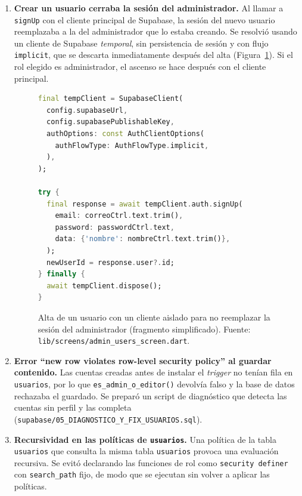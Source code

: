 \begin{enumerate}
  \item \textbf{Crear un usuario cerraba la sesión del administrador.}
  Al llamar a \texttt{signUp} con el cliente principal de Supabase, la
  sesión del nuevo usuario reemplazaba a la del administrador que lo
  estaba creando. Se resolvió usando un cliente de Supabase
  \emph{temporal}, sin persistencia de sesión y con flujo
  \texttt{implicit}, que se descarta inmediatamente después del alta
  (Figura~\ref{fig:impl-tempclient}). Si el rol elegido es
  administrador, el ascenso se hace después con el cliente principal.

\begin{figure}[H]
\begin{lstlisting}[style=codigo,language=Dart]
final tempClient = SupabaseClient(
  config.supabaseUrl,
  config.supabasePublishableKey,
  authOptions: const AuthClientOptions(
    authFlowType: AuthFlowType.implicit,
  ),
);

try {
  final response = await tempClient.auth.signUp(
    email: correoCtrl.text.trim(),
    password: passwordCtrl.text,
    data: {'nombre': nombreCtrl.text.trim()},
  );
  newUserId = response.user?.id;
} finally {
  await tempClient.dispose();
}
\end{lstlisting}
\caption{Alta de un usuario con un cliente aislado para no reemplazar la
sesión del administrador (fragmento simplificado). Fuente:
\texttt{lib/screens/admin\_users\_screen.dart}.}
\label{fig:impl-tempclient}
\end{figure}

  \item \textbf{Error ``new row violates row-level security policy''
  al guardar contenido.} Las cuentas creadas antes de instalar el
  \emph{trigger} no tenían fila en \texttt{usuarios}, por lo que
  \texttt{es\_admin\_o\_editor()} devolvía falso y la base de datos
  rechazaba el guardado. Se preparó un script de diagnóstico que detecta
  las cuentas sin perfil y las completa
  (\texttt{supabase/05\_DIAGNOSTICO\_Y\_FIX\_USUARIOS.sql}).

  \item \textbf{Recursividad en las políticas de \texttt{usuarios}.} Una
  política de la tabla \texttt{usuarios} que consulta la misma tabla
  \texttt{usuarios} provoca una evaluación recursiva. Se evitó declarando
  las funciones de rol como \texttt{security definer} con
  \texttt{search\_path} fijo, de modo que se ejecutan sin volver a
  aplicar las políticas.


\end{enumerate}
